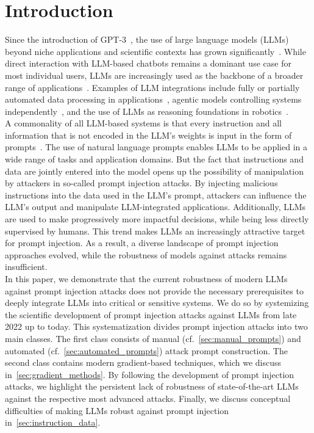 \section{Introduction} \label{sec:introduction}
Since the introduction of GPT-3~\cite{NEURIPS2020_1457c0d6}, the use of large language models (LLMs) beyond niche applications and scientific contexts has grown significantly~\cite{hu_chatgpt_2023, annepaka_large_2025, bharathi_mohan_analysis_2024}.
While direct interaction with LLM-based chatbots remains a dominant use case for most individual users, LLMs are increasingly used as the backbone of a broader range of applications~\cite{raza_industrial_2025, chkirbene_large_2024}.
Examples of LLM integrations include fully or partially automated data processing in applications~\cite{tao_harnessing_2024, shehmir_llm4rec_2025}, agentic models controlling systems independently~\cite{guan_intelligent_2024, zhang_large_2025, luo_large_2025}, and the use of LLMs as reasoning foundations in robotics~\cite{kim_survey_2024, wang_large_2025, jeong_survey_2024}.\\

A commonality of all LLM-based systems is that every instruction and all information that is not encoded in the LLM's weights is input in the form of prompts~\cite{kamath_prompt-based_2024}.
The use of natural language prompts enables LLMs to be applied in a wide range of tasks and application domains.
But the fact that instructions and data are jointly entered into the model opens up the possibility of manipulation by attackers in so-called prompt injection attacks.
By injecting malicious instructions into the data used in the LLM's prompt, attackers can influence the LLM's output and manipulate LLM-integrated applications.
Additionally, LLMs are used to make progressively more impactful decisions, while being less directly supervised by humans.
This trend makes LLMs an increasingly attractive target for prompt injection.
As a result, a diverse landscape of prompt injection approaches evolved, while the robustness of models against attacks remains insufficient.\\

In this paper, we demonstrate that the current robustness of modern LLMs against prompt injection attacks does not provide the necessary prerequisites to deeply integrate LLMs into critical or sensitive systems.
We do so by systemizing the scientific development of prompt injection attacks against LLMs from late 2022 up to today.
This systematization divides prompt injection attacks into two main classes.
The first class consists of manual (cf.~\cref{sec:manual_prompts}) and automated (cf.~\cref{sec:automated_prompts}) attack prompt construction.
The second class contains modern gradient-based techniques, which we discuss in~\cref{sec:gradient_methods}.
By following the development of prompt injection attacks, we highlight the persistent lack of robustness of state-of-the-art LLMs against the respective most advanced attacks.
Finally, we discuss conceptual difficulties of making LLMs robust against prompt injection in~\cref{sec:instruction_data}.
